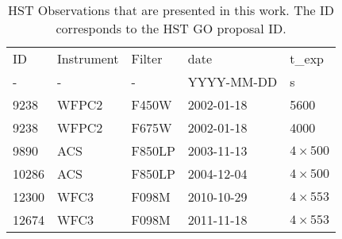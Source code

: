 \begin{table}
\begin{tabular}{lllll}
\toprule
    ID & Instrument & Filter &        date &   t\_exp \\
- & - & - & YYYY-MM-DD & s\\
\midrule
  9238 &      WFPC2 &   F450W & 2002-01-18 &    5600 \\
  9238 &      WFPC2 &   F675W & 2002-01-18 &    4000 \\
  9890 &        ACS &  F850LP & 2003-11-13 &    $4\times500$ \\
 10286 &        ACS &  F850LP & 2004-12-04 &    $4\times500$ \\
 12300 &       WFC3 &   F098M & 2010-10-29 &  $4\times553$ \\
 12674 &       WFC3 &   F098M & 2011-11-18 &  $4\times553$ \\
\bottomrule

\end{tabular}

\caption{HST Observations that are presented in this work. The ID corresponds to the HST GO proposal ID.}
\label{tab:obs_table}
\end{table}
